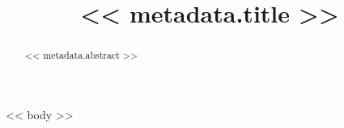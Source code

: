 \documentclass[preprint]{oscmjournal}
\title{<< metadata.title >>}
\begin{document}

\maketitle

\begin{abstract}
<< metadata.abstract >>
\end{abstract}

<< body >>
\end{document}
